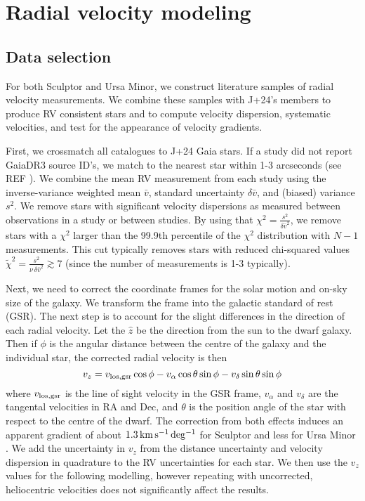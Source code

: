 \chapter{Radial velocity modeling}\label{sec:rv_obs}

\section{Data selection}\label{data-selection}

For both Sculptor and Ursa Minor, we construct literature samples of
radial velocity measurements. We combine these samples with J+24's
members to produce RV consistent stars and to compute velocity
dispersion, systematic velocities, and test for the appearance of
velocity gradients.

First, we crossmatch all catalogues to J+24 Gaia stars. If a study did
not report GaiaDR3 source ID's, we match to the nearest star within 1-3
arcseconds (see REF \citet{tab:rv_measurements}). We combine the mean RV
measurement from each study using the inverse-variance weighted mean
\(\bar v\), standard uncertainty \(\delta \bar v\), and (biased)
variance \(s^2\). We remove stars with significant velocity dispersions
as measured between observations in a study or between studies. By using
that \(\chi^2=\frac{s^2}{\delta \bar v^2}\), we remove stars with a
\(\chi^2\) larger than the 99.9th percentile of the \(\chi^2\)
distribution with \(N-1\) measurements. This cut typically removes stars
with reduced chi-squared values
\(\tilde\chi^2  = \frac{s^2}{\nu\,\delta \bar v^2}\gtrsim 7\) (since the
number of measurements is 1-3 typically).

Next, we need to correct the coordinate frames for the solar motion and
on-sky size of the galaxy. We transform the frame into the galactic
standard of rest (GSR). The next step is to account for the slight
differences in the direction of each radial velocity. Let the \(\hat z\)
be the direction from the sun to the dwarf galaxy. Then if \(\phi\) is
the angular distance between the centre of the galaxy and the individual
star, the corrected radial velocity is then \begin{equation}{
v_z = v_{\rm los, gsr}\cos\phi  - v_{\alpha}\cos\theta \sin\phi - v_\delta \sin\theta\sin\phi
}\end{equation} where \(v_{\rm los, gsr}\) is the line of sight velocity
in the GSR frame, \(v_\alpha\) and \(v_\delta\) are the tangental
velocities in RA and Dec, and \(\theta\) is the position angle of the
star with respect to the centre of the dwarf. The correction from both
effects induces an apparent gradient of about \(1.3\,{\rm km\,s^{-1}\,deg^{-1}}\) for
Sculptor and less for Ursa Minor \citep[see
also][]{WMO2008, strigari2010}. We add the uncertainty in \(v_z\) from
the distance uncertainty and velocity dispersion in quadrature to the RV
uncertainties for each star. We then use the \(v_z\) values for the
following modelling, however repeating with uncorrected, heliocentric
velocities does not significantly affect the results.

